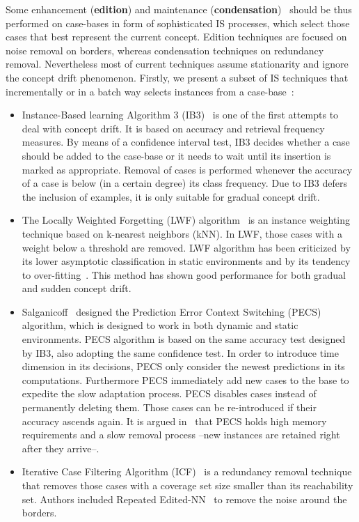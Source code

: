 \documentclass[preprint,12pt]{elsarticle}
\begin{document}
Some enhancement (\textbf{edition}) and maintenance (\textbf{condensation})~\cite{garcia14} should be thus performed on case-bases in form of sophisticated IS processes, which select those cases that best represent the current concept. Edition techniques are focused on noise removal on borders, whereas condensation techniques on redundancy removal. Nevertheless most of current techniques assume stationarity and ignore the concept drift phenomenon. Firstly, we present a subset of IS techniques that incrementally or in a batch way selects instances from a case-base~\cite{garcia12}:

\begin{itemize}
	\item Instance-Based learning Algorithm 3 (IB3)~\cite{aha91} is one of the first attempts to deal with concept drift. It is based on accuracy and retrieval frequency measures. By means of a confidence interval test, IB3 decides whether a case should be added to the case-base or it needs to wait until its insertion is marked as appropriate. Removal of cases is performed whenever the accuracy of a case is below (in a certain degree) its class frequency. Due to IB3 defers the inclusion of examples, it is only suitable for gradual concept drift. 
	\item The Locally Weighted Forgetting (LWF) algorithm~\cite{salga93} is an instance weighting technique based on k-nearest neighbors (kNN). In LWF, those cases with a weight below a threshold are removed. LWF algorithm has been criticized by its lower asymptotic classification in static environments and by its tendency to over-fitting~\cite{klinken04}. This method has shown good performance for both gradual and sudden concept drift. 
	\item Salganicoff~\cite{salga97} designed the Prediction Error Context Switching (PECS) algorithm, which is designed to work in both dynamic and static environments. PECS algorithm is based on the same accuracy test designed by IB3, also adopting the same confidence test. In order to introduce time dimension in its decisions, PECS only consider the newest predictions in its computations. Furthermore PECS immediately add new cases to the base to expedite the slow adaptation process. PECS disables cases instead of permanently deleting them. Those cases can be re-introduced if their accuracy ascends again. It is argued in~\cite{berin07} that PECS holds high memory requirements and a slow removal process --new instances are retained right after they arrive--.
	\item Iterative Case Filtering Algorithm (ICF)~\cite{brighton02} is a redundancy removal technique that removes those cases with a coverage set size smaller than its reachability set. Authors included Repeated Edited-NN~\cite{tomek76} to remove the noise around the borders.
\end{itemize}
\end{document}
